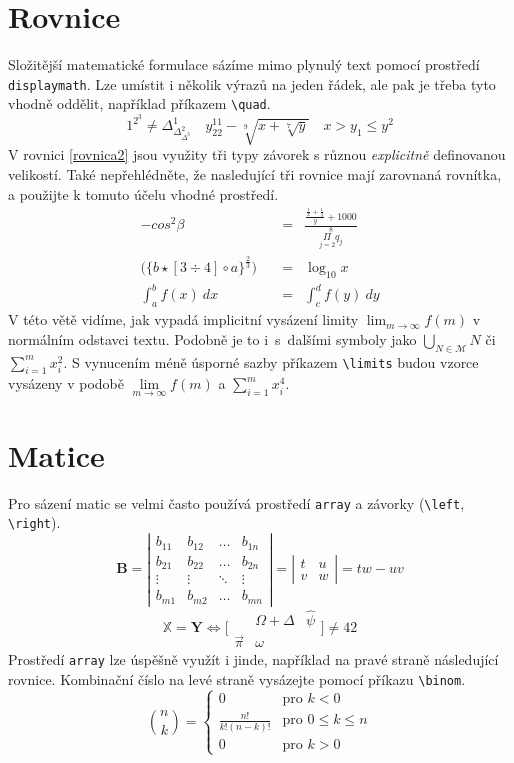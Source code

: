 \documentclass[a4paper, twocolumn, 11pt]{article}
\begin{document}
\section{Rovnice}
Složitější matematické formulace sázíme mimo plynulý text pomocí prostředí \texttt{displaymath}. Lze umístit i několik výrazů na jeden řádek, ale pak je třeba tyto vhodně oddělit, například příkazem \verb|\quad|. 
$$
1^{2^3} \neq \Delta_{\Delta_{\Delta^3}^2}^1 \quad y_{22}^{11}-\sqrt[9]{x+\sqrt[7]{y}} \quad x>y_1\leq y^2 
$$
V rovnici \eqref{rovnica2} jsou využity tři typy závorek s různou \emph{explicitně} definovanou velikostí. Také nepřehlédněte, že nasledující tři rovnice mají zarovnaná rovnítka, a použijte k tomuto účelu vhodné prostředí. 
\begin{eqnarray}
-cos^2\beta &=& \frac{\frac{\frac{1}{x}+\frac{1}{3}}{y}+1000}{\overset{8}{\underset{j=2}{\Pi}q_j}}\label{rovnica1}\\
\bigg(\Big \{ b \star [ 3 \div 4 ]\circ a \Big \}^\frac{2}{3} \bigg) \quad &=& \log_{10} x \label{rovnica2}\\
\int_{a}^b f(x)\ dx &=& \int_{c}^d f(y)\ dy \label{rovnica3}
\end{eqnarray}
V této větě vidíme, jak vypadá implicitní vysázení limity $\lim_{m\rightarrow\infty}f(m)$ v normálním odstavci textu. Podobně je to i~s~dalšími symboly jako $\bigcup_{N\in \mathcal{M}} N$ či $\sum_{i=1}^m x_{i}^2$. S vynucením méně úsporné sazby příkazem \verb|\limits| budou vzorce vysázeny v podobě $\lim\limits_{m\rightarrow\infty}f(m)$ a $\sum\limits_{i=1}^m x_{i}^4$.

\section{Matice}
Pro sázení matic se velmi často používá prostředí \texttt{array} a závorky (\verb|\left|, \verb|\right|). 
$$
\mathbf{B}=\left|\begin{array}{cccc}
b_{11} & b_{12} & \dots & b_{1 n} \\
b_{21} & b_{22} & \dots & b_{2 n} \\
\vdots & \vdots & \ddots & \vdots \\
b_{m 1} & b_{m 2} & \dots & b_{m n}
\end{array}\right|=\left|\begin{array}{cc}
t & u \\
v & w
\end{array}\right|=t w-u v
$$
$$
\mathbb X = \mathbf {Y} \Longleftrightarrow \bigg [ \begin{array}{ccc}
     & \Omega +\Delta & \hat{\psi}  \\
  \vec{\pi}   &  \omega
\end{array}\bigg ] \neq 42
$$
Prostředí \texttt{array} lze úspěšně využít i jinde, například na pravé straně následující rovnice. Kombinační číslo na levé straně vysázejte pomocí příkazu \verb|\binom|.
$$
\binom{n}{k}=\left\{\begin{array}{cl}
0 & \text {pro } k < 0 \\
\frac{n !}{k !(n-k) !} & \text {pro } 0 \leq k \leq n \\
0 & \text {pro } k>0 
\end{array}\right.
$$
\end{document}
